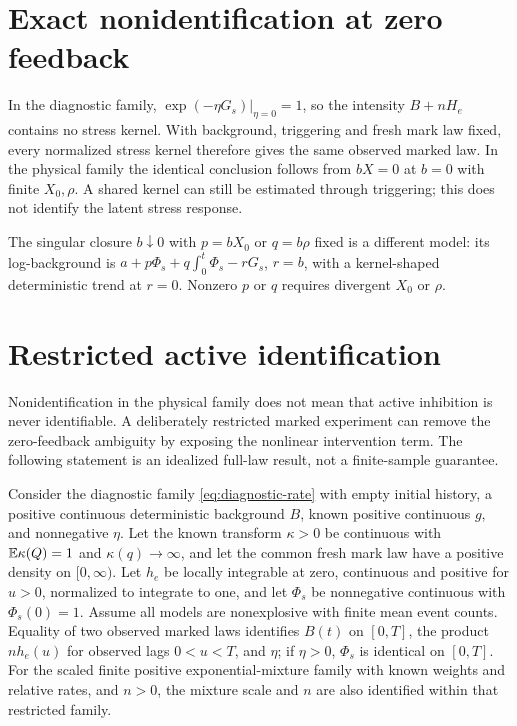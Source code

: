 \section{Exact nonidentification at zero feedback}

\begin{remark}
\label{prop:nonidentification}
In the diagnostic family, $\exp(-\eta G_s)|_{\eta=0}=1$, so the intensity
$B+nH_e$ contains no stress kernel. With background, triggering and fresh mark
law fixed, every normalized stress kernel therefore gives the same observed
marked law. In the physical family the identical conclusion follows from
$bX=0$ at $b=0$ with finite $X_0,\rho$. A shared kernel can still be estimated
through triggering; this does not identify the latent stress response.

The singular closure $b\downarrow0$ with $p=bX_0$ or $q=b\rho$ fixed is a
different model: its log-background is
$a+p\Phi_s+q\int_0^t\Phi_s-rG_s$, $r=b$, with a kernel-shaped deterministic
trend at $r=0$. Nonzero $p$ or $q$ requires divergent $X_0$ or $\rho$.
\end{remark}

\section{Restricted active identification}

Nonidentification in the physical family does not mean that active inhibition is never identifiable. A deliberately restricted marked experiment can remove the zero-feedback ambiguity by exposing the nonlinear intervention term. The following statement is an idealized full-law result, not a finite-sample guarantee.

\begin{proposition}
\label{prop:active_identification}
Consider the diagnostic family \eqref{eq:diagnostic-rate} with empty initial history, a positive continuous deterministic background \(B\), known positive continuous \(g\), and nonnegative \(\eta\). Let the known transform \(\kappa>0\) be continuous with \(\mathbb{E} \kappa(Q)=1\) and \(\kappa(q)\to\infty\), and let the common fresh mark law have a positive density on \([0,\infty)\). Let \(h_e\) be locally integrable at zero, continuous and positive for \(u>0\), normalized to integrate to one, and let \(\Phi_s\) be nonnegative continuous with \(\Phi_s(0)=1\). Assume all models are nonexplosive with finite mean event counts. Equality of two observed marked laws identifies \(B(t)\) on \([0,T]\), the product \(n h_e(u)\) for observed lags \(0<u<T\), and \(\eta\); if \(\eta>0\), \(\Phi_s\) is identical on \([0,T]\). For the scaled finite positive exponential-mixture family with known weights and relative rates, and \(n>0\), the mixture scale and \(n\) are also identified within that restricted family.
\end{proposition}

